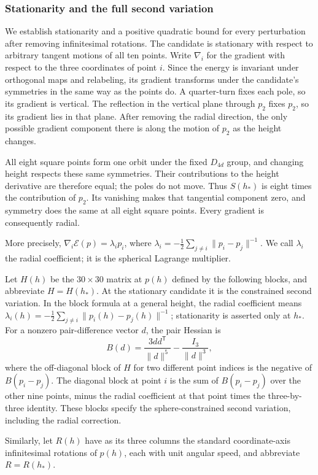 \documentclass[11pt]{article}
\newcommand{\E}{\mathcal{E}}
\begin{document}
\subsubsection{Stationarity and the full second variation}
We establish stationarity and a positive quadratic bound for every
perturbation after removing infinitesimal rotations.
The candidate is stationary with respect to arbitrary tangent motions
of all ten points. Write $\nabla_i$ for the gradient with respect to the
three coordinates of point $i$. Since the energy is invariant under
orthogonal maps and relabeling, its gradient transforms under the
candidate's symmetries in the same way as the points do. A quarter-turn
fixes each pole, so its gradient is vertical. The reflection in the
vertical plane through $p_2$ fixes $p_2$, so its gradient lies in that
plane. After removing the radial direction, the only possible gradient
component there is along the motion of $p_2$ as the height changes.

All eight square points form one orbit under the fixed $D_{4d}$ group,
and changing height respects these same symmetries. Their contributions
to the height derivative are therefore equal; the poles do not move.
Thus $S(h_*)$ is eight times the contribution of $p_2$. Its vanishing
makes that tangential component zero, and symmetry does the same at all
eight square points. Every gradient is consequently radial.

More precisely,
$\nabla_i\E(p)=\lambda_i p_i$, where
$\lambda_i=-\tfrac12\sum_{j\ne i}\|p_i-p_j\|^{-1}$.
We call $\lambda_i$ the radial coefficient; it is the spherical Lagrange
multiplier.

Let $H(h)$ be the $30\times30$ matrix at $p(h)$ defined by the following
blocks, and abbreviate $H=H(h_*)$. At the stationary candidate it is
the constrained second variation.
In the block formula at a general height,
the radial coefficient means
$\lambda_i(h)=-\tfrac12\sum_{j\ne i}\|p_i(h)-p_j(h)\|^{-1}$;
stationarity is asserted only at $h_*$.
For a nonzero pair-difference vector $d$, the pair
Hessian is
\[
 B(d)=\frac{3dd^{\mathsf T}}{\|d\|^5}
           -\frac{I_3}{\|d\|^3},
\]
where the off-diagonal block of $H$ for two different point indices is the
negative of $B(p_i-p_j)$. The diagonal block at point $i$ is the sum of
$B(p_i-p_j)$ over the other nine points, minus the radial coefficient at
that point times the three-by-three identity. These blocks specify the sphere-constrained second variation, including
the radial correction.

Similarly, let $R(h)$ have as its three columns the standard
coordinate-axis infinitesimal rotations of $p(h)$, each with unit angular
speed, and abbreviate $R=R(h_*)$.
\end{document}

